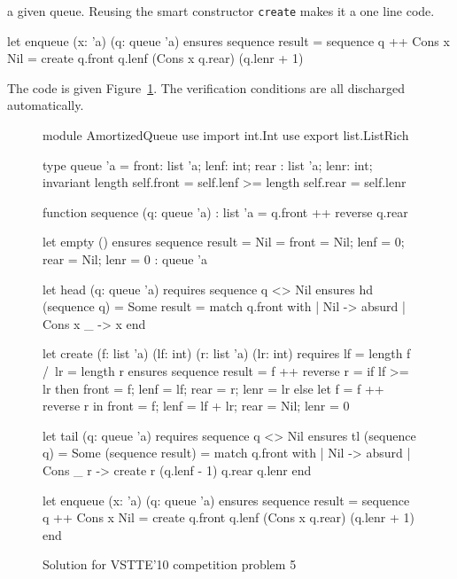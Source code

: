 a given queue. Reusing the smart constructor \texttt{create} makes it
a one line code.
\begin{whycode}
  let enqueue (x: 'a) (q: queue 'a)
    ensures { sequence result = sequence q ++ Cons x Nil }
  = create q.front q.lenf (Cons x q.rear) (q.lenr + 1)
\end{whycode}
The code is given Figure~\ref{fig:AQueue}.
The verification conditions are all discharged automatically.
\begin{figure}[p]
  \centering
\begin{whycode}
module AmortizedQueue
  use import int.Int
  use export list.ListRich

  type queue 'a = { front: list 'a; lenf: int;
                    rear : list 'a; lenr: int; }
  invariant {
    length self.front = self.lenf >= length self.rear = self.lenr }

  function sequence (q: queue 'a) : list 'a = q.front ++ reverse q.rear

  let empty () ensures { sequence result = Nil }
  = { front = Nil; lenf = 0; rear = Nil; lenr = 0 } : queue 'a

  let head (q: queue 'a)
    requires { sequence q <> Nil }
    ensures { hd (sequence q) = Some result }
  = match q.front with
      | Nil      -> absurd
      | Cons x _ -> x
    end

  let create (f: list 'a) (lf: int) (r: list 'a) (lr: int)
    requires { lf = length f /\ lr = length r }
    ensures  { sequence result = f ++ reverse r }
  = if lf >= lr then
      { front = f; lenf = lf; rear = r; lenr = lr }
    else
      let f = f ++ reverse r in
      { front = f; lenf = lf + lr; rear = Nil; lenr = 0 }

  let tail (q: queue 'a)
    requires { sequence q <> Nil }
    ensures  { tl (sequence q) = Some (sequence result) }
  = match q.front with
      | Nil      -> absurd
      | Cons _ r -> create r (q.lenf - 1) q.rear q.lenr
    end

  let enqueue (x: 'a) (q: queue 'a)
    ensures { sequence result = sequence q ++ Cons x Nil }
  = create q.front q.lenf (Cons x q.rear) (q.lenr + 1)
end
\end{whycode}
\vspace*{-1em}%
  \caption{Solution for VSTTE'10 competition problem 5}
  \label{fig:AQueue}
\end{figure}



